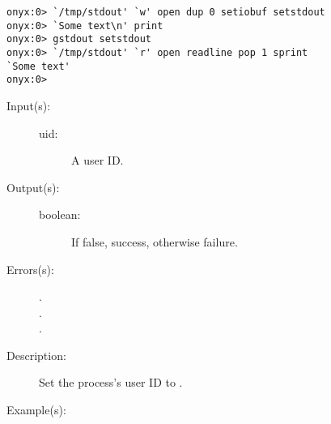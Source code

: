 \begin{description}
\begin{description}
\begin{verbatim}
onyx:0> `/tmp/stdout' `w' open dup 0 setiobuf setstdout
onyx:0> `Some text\n' print
onyx:0> gstdout setstdout
onyx:0> `/tmp/stdout' `r' open readline pop 1 sprint
`Some text'
onyx:0>
		\end{verbatim}
	\end{description}
\label{systemdict:setuid}
\item[{\onyxop{uid}{setuid}{boolean}}: ]
	\begin{description}\item[]
	\item[Input(s): ]
		\begin{description}\item[]
		\item[uid: ]
			A user ID.
		\end{description}
	\item[Output(s): ]
		\begin{description}\item[]
		\item[boolean: ]
			If false, success, otherwise failure.
		\end{description}
	\item[Errors(s): ]
		\begin{description}\item[]
		\item[.]
		\item[.]
		\item[.]
		\end{description}
	\item[Description: ]
		Set the process's user ID to .
	\item[Example(s): ]\begin{verbatim}


\end{verbatim}
\end{description}
\end{description}
